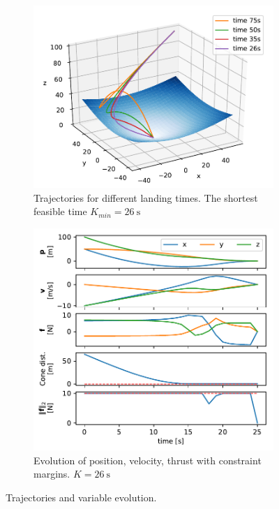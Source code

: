 \documentclass[12pt, letterpaper]{article}
\begin{document}
\begin{figure}[H]
  \begin{subfigure}[b]{0.5\textwidth}
    \includegraphics[width=\textwidth]{traj_multi.pdf}
    \vspace{0.5cm}
    \caption{Trajectories for different landing times. The shortest feasible time $K_{min}=\SI{26}{\second}$}
    \label{fig:traj_multi}
  \end{subfigure}
  \begin{subfigure}[b]{0.5\textwidth}
    \includegraphics[width=\textwidth]{variables26.pdf}
    \caption{Evolution of position, velocity, thrust with constraint margins. $K=\SI{26}{\second}$}
    \label{fig:var26}
  \end{subfigure}
  \caption{Trajectories and variable evolution.}
  \label{fig:trandandvariables26}
\end{figure}
\end{document}
